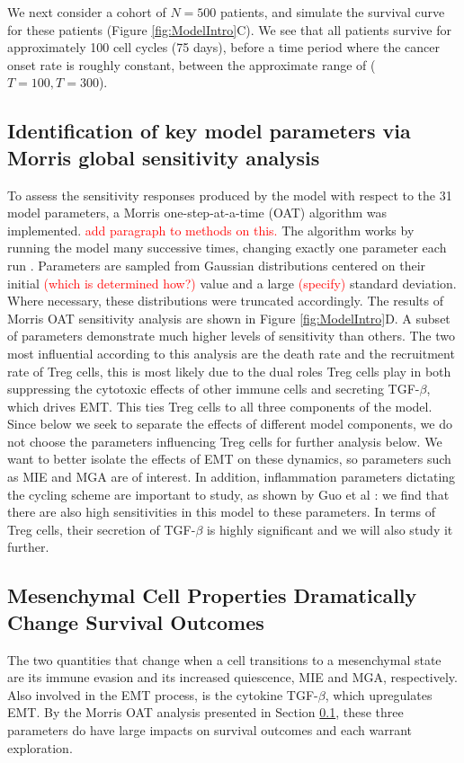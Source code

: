 \documentclass[11pt, a4paper, preprint]{article}
\newcommand{\tcr} { \textcolor{red} }
\begin{document}
We next consider a cohort of $N=500$ patients, and simulate the survival curve for these patients (Figure \ref{fig:ModelIntro}C). We see that all patients survive for approximately 100 cell cycles (75 days), before a time period where the cancer onset rate is roughly constant, between the approximate range of ($T = 100, T = 300$).


\subsection{Identification of key model parameters via Morris global sensitivity analysis}\label{SensAnalysis}
To assess the sensitivity responses produced by the model with respect to the 31 model parameters, a Morris one-step-at-a-time (OAT) algorithm was implemented. \tcr{add paragraph to methods on this.}
The algorithm works by running the model many successive times, changing exactly one parameter each run \cite{morris1991factorial, sohier2014improvement}. Parameters are sampled from Gaussian distributions centered on their initial \tcr{(which is determined how?)} value and a large \tcr{(specify)} standard deviation. Where necessary, these distributions were truncated accordingly.
The results of Morris OAT sensitivity analysis are shown in Figure \ref{fig:ModelIntro}D. A subset of parameters demonstrate much higher levels of sensitivity than others.
The two most influential according to this analysis are the death rate and the recruitment rate of Treg cells, this is most likely due to the dual roles Treg cells play in both suppressing the cytotoxic effects of other immune cells and secreting TGF-$\beta$, which drives EMT. This ties Treg cells to all three components of the model. Since below we seek to separate the effects of different model components, we do not choose the parameters influencing Treg cells for further analysis below. 
We want to better isolate the effects of EMT on these dynamics, so parameters such as MIE and MGA are of interest.
In addition, inflammation parameters dictating the cycling scheme are important to study, as shown by Guo et al \cite{}: we find that there are also high sensitivities in this model to these parameters.
In terms of Treg cells, their secretion of TGF-$\beta$ is highly significant and we will also study it further.



\subsection{Mesenchymal Cell Properties Dramatically Change Survival Outcomes}\label{MesPars}
The two quantities that change when a cell transitions to a mesenchymal state are its immune evasion and its increased quiescence, MIE and MGA, respectively.
Also involved in the EMT process, is the cytokine TGF-$\beta$, which upregulates EMT.
By the Morris OAT analysis presented in Section \ref{SensAnalysis}, these three parameters do have large impacts on survival outcomes and each warrant exploration.
\end{document}
